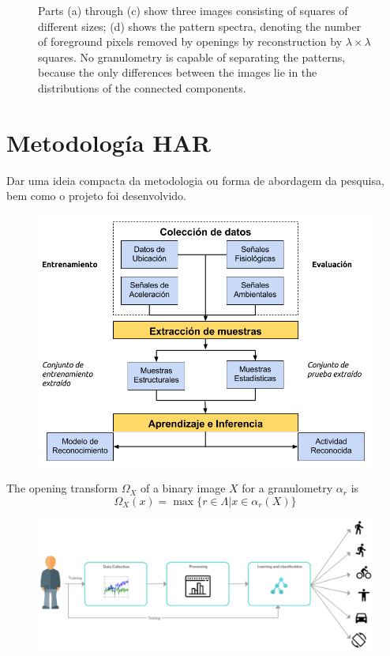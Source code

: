 \documentclass{sciposter}
\begin{document}
\begin{multicols}{3}
\begin{figure}
\begin{center}
\begin{tabular}{c c}
\end{tabular}
\end{center}
\caption{ Parts (a) through (c) show three images consisting of squares of
different sizes;
(d) shows the pattern spectra, denoting the number of foreground pixels 
 removed by openings by reconstruction by $\lambda \times \lambda$ squares. No 
granulometry is capable of separating the patterns, because the only 
differences between the images lie in the distributions of the 
connected components. }\label{fig:blocks}
\end{figure}




\section{Metodología HAR}
Dar uma ideia compacta da metodologia ou forma de abordagem da pesquisa, bem como o projeto foi desenvolvido.\\

\begin{figure}
	\centering
	\includegraphics[width=0.7\linewidth]{../capitulo-2/graphics/harsystem}
	\caption{}
	\label{fig:harsystem}
\end{figure}


The opening transform \cite{Nacken:thesis} $\Omega_X$ of a binary image $X$ 
for a granulometry ${\alpha_r}$ is
\begin{equation}
  \Omega_X(x) = \max\{ r \in \Lambda \vert x \in \alpha_r(X) \}
\end{equation}

\begin{figure}
	\centering
	\includegraphics[width=0.7\linewidth]{../capitulo-2/graphics/harsystem2}
	\caption{}
	\label{fig:harsystem2}
\end{figure}



\end{multicols}
\end{document}

